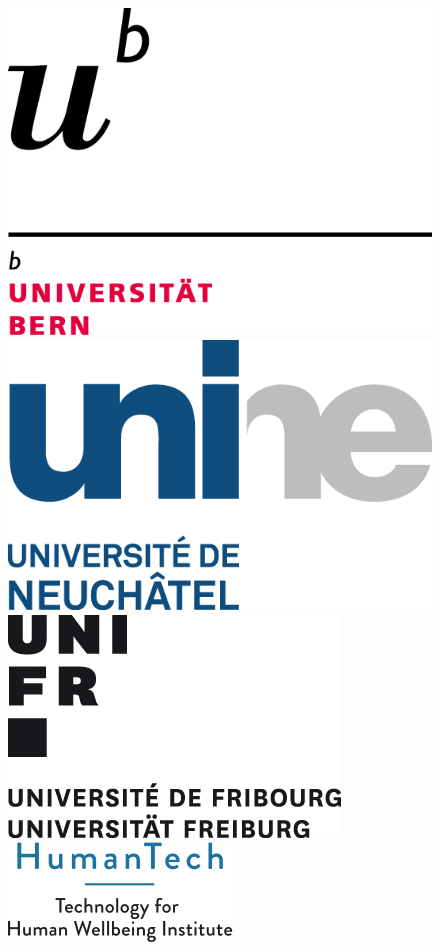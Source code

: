 \documentclass[11pt,a4paper,twoside,hidelinks,openright]{rvsmaster}
\begin{document}
\begin{titlepage}
\begin{center}
  \begin{figure}[htp]
    \centering
    \includegraphics[scale=0.26]{logos/UNI_Bern.png}\hfill
    \includegraphics[scale=0.28]{logos/UNI_Neuenburg.png}\hfill
    \includegraphics[scale=0.80]{logos/UNI_Fribourg.png}\hfill
    \includegraphics[scale=0.90]{logos/HumanTech.png}
  \end{figure}



\end{center}
\end{titlepage}
\end{document}
